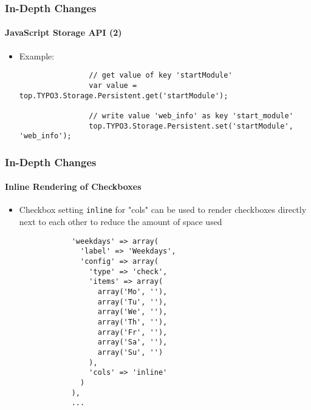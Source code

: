 \begin{frame}[fragile]
	\frametitle{In-Depth Changes}
	\framesubtitle{JavaScript Storage API (2)}

	\begin{itemize}
		\item Example:
			\begin{lstlisting}
				// get value of key 'startModule'
				var value = top.TYPO3.Storage.Persistent.get('startModule');

				// write value 'web_info' as key 'start_module'
				top.TYPO3.Storage.Persistent.set('startModule', 'web_info');
			\end{lstlisting}

	\end{itemize}

\end{frame}


\begin{frame}[fragile]
	\frametitle{In-Depth Changes}
	\framesubtitle{Inline Rendering of Checkboxes}

	\lstset{basicstyle=\tiny\ttfamily}

	\begin{itemize}

		\item Checkbox setting \texttt{inline} for "cols" can be used to render checkboxes
			directly next to each other to reduce the amount of space used

		\begin{lstlisting}
			'weekdays' => array(
			  'label' => 'Weekdays',
			  'config' => array(
			    'type' => 'check',
			    'items' => array(
			      array('Mo', ''),
			      array('Tu', ''),
			      array('We', ''),
			      array('Th', ''),
			      array('Fr', ''),
			      array('Sa', ''),
			      array('Su', '')
			    ),
			    'cols' => 'inline'
			  )
			),
			...
		\end{lstlisting}

	\end{itemize}

\end{frame}

